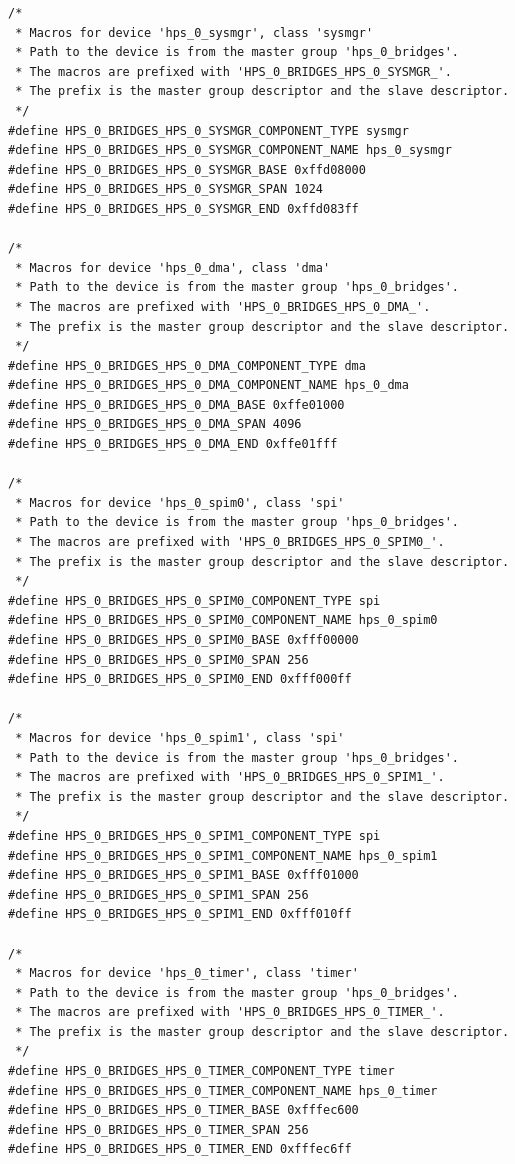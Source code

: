 \documentclass[conference]{IEEEtran}
\begin{document}
\begin{lstlisting}
/*
 * Macros for device 'hps_0_sysmgr', class 'sysmgr'
 * Path to the device is from the master group 'hps_0_bridges'.
 * The macros are prefixed with 'HPS_0_BRIDGES_HPS_0_SYSMGR_'.
 * The prefix is the master group descriptor and the slave descriptor.
 */
#define HPS_0_BRIDGES_HPS_0_SYSMGR_COMPONENT_TYPE sysmgr
#define HPS_0_BRIDGES_HPS_0_SYSMGR_COMPONENT_NAME hps_0_sysmgr
#define HPS_0_BRIDGES_HPS_0_SYSMGR_BASE 0xffd08000
#define HPS_0_BRIDGES_HPS_0_SYSMGR_SPAN 1024
#define HPS_0_BRIDGES_HPS_0_SYSMGR_END 0xffd083ff

/*
 * Macros for device 'hps_0_dma', class 'dma'
 * Path to the device is from the master group 'hps_0_bridges'.
 * The macros are prefixed with 'HPS_0_BRIDGES_HPS_0_DMA_'.
 * The prefix is the master group descriptor and the slave descriptor.
 */
#define HPS_0_BRIDGES_HPS_0_DMA_COMPONENT_TYPE dma
#define HPS_0_BRIDGES_HPS_0_DMA_COMPONENT_NAME hps_0_dma
#define HPS_0_BRIDGES_HPS_0_DMA_BASE 0xffe01000
#define HPS_0_BRIDGES_HPS_0_DMA_SPAN 4096
#define HPS_0_BRIDGES_HPS_0_DMA_END 0xffe01fff

/*
 * Macros for device 'hps_0_spim0', class 'spi'
 * Path to the device is from the master group 'hps_0_bridges'.
 * The macros are prefixed with 'HPS_0_BRIDGES_HPS_0_SPIM0_'.
 * The prefix is the master group descriptor and the slave descriptor.
 */
#define HPS_0_BRIDGES_HPS_0_SPIM0_COMPONENT_TYPE spi
#define HPS_0_BRIDGES_HPS_0_SPIM0_COMPONENT_NAME hps_0_spim0
#define HPS_0_BRIDGES_HPS_0_SPIM0_BASE 0xfff00000
#define HPS_0_BRIDGES_HPS_0_SPIM0_SPAN 256
#define HPS_0_BRIDGES_HPS_0_SPIM0_END 0xfff000ff

/*
 * Macros for device 'hps_0_spim1', class 'spi'
 * Path to the device is from the master group 'hps_0_bridges'.
 * The macros are prefixed with 'HPS_0_BRIDGES_HPS_0_SPIM1_'.
 * The prefix is the master group descriptor and the slave descriptor.
 */
#define HPS_0_BRIDGES_HPS_0_SPIM1_COMPONENT_TYPE spi
#define HPS_0_BRIDGES_HPS_0_SPIM1_COMPONENT_NAME hps_0_spim1
#define HPS_0_BRIDGES_HPS_0_SPIM1_BASE 0xfff01000
#define HPS_0_BRIDGES_HPS_0_SPIM1_SPAN 256
#define HPS_0_BRIDGES_HPS_0_SPIM1_END 0xfff010ff

/*
 * Macros for device 'hps_0_timer', class 'timer'
 * Path to the device is from the master group 'hps_0_bridges'.
 * The macros are prefixed with 'HPS_0_BRIDGES_HPS_0_TIMER_'.
 * The prefix is the master group descriptor and the slave descriptor.
 */
#define HPS_0_BRIDGES_HPS_0_TIMER_COMPONENT_TYPE timer
#define HPS_0_BRIDGES_HPS_0_TIMER_COMPONENT_NAME hps_0_timer
#define HPS_0_BRIDGES_HPS_0_TIMER_BASE 0xfffec600
#define HPS_0_BRIDGES_HPS_0_TIMER_SPAN 256
#define HPS_0_BRIDGES_HPS_0_TIMER_END 0xfffec6ff


\end{lstlisting}
\end{document}
